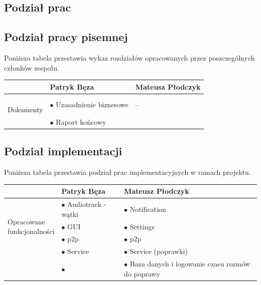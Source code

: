 \documentclass[a4paper,titlepage]{article}
\theoremstyle{break}
\begin{document}
\begin{appendices}

\section{Podział prac}
\subsection{Podział pracy pisemnej}

Poniższa tabela przestawia wykaz rozdziałów opracowanych przez poszczególnych członków zespołu.

\begin{table}[H]
\center
\begin{tabular}{p{2.5cm}|p{5cm}|p{5cm}}
& Patryk Bęza & Mateusz Płodczyk \\\hline\hline
\parbox{3cm}{\ \\Dokumenty} & $\bullet$ Uzasadnienie biznesowe & --\\
& $\bullet$ Raport końcowy & \\
\end{tabular}
\end{table}

\subsection{Podział implementacji}

Poniższa tabela przestawia podział prac implementacyjnych w ramach projektu.

\begin{table}[H]
\center
\begin{tabular}{p{2.5cm}|p{5cm}|p{5cm}}
& Patryk Bęza & Mateusz Płodczyk \\\hline\hline
\multirow{3}{*}{\parbox{3cm}{\ \\Opracowane \\funkcjonalności}} & $\bullet$ Audiotrack - wątki & $\bullet$ Notification\\
& $\bullet$ GUI & $\bullet$ Settings \\
& $\bullet$ p2p & $\bullet$ p2p \\
& $\bullet$ Service & $\bullet$ Service (poprawki) \\
& $\bullet$  & $\bullet$ Baza danych i logowanie czasu rozmów do poprawy \\
\end{tabular}
\end{table}

\end{appendices}


\clearpage
\renewcommand\refname{Linki}


\end{document}
